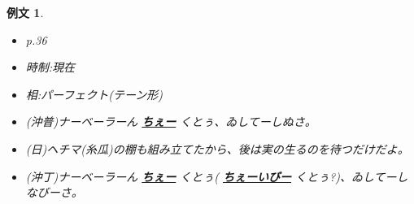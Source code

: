 \documentclass[a4j,12pt]{jarticle}
\theoremstyle{break}
\newtheorem{example}{例文}
\newcommand{\highlight}[1]{
  \textbf{\underline{#1}}
}
\begin{document}
\begin{example}
  \begin{itemize}
  \item p.36
  \item 時制:現在
  \item 相:パーフェクト(テーン形)
  \item (沖普)ナーベーラーん\highlight{ちぇー}くとぅ、ゐしてーしぬさ。
  \item (日)ヘチマ(糸瓜)の棚も組み立てたから、後は実の生るのを待つだけだよ。
  \item (沖丁)ナーベーラーん\highlight{ちぇー}くとぅ(\highlight{\ruby{組}{か}ちぇーいびー}くとぅ?)、ゐしてーしなびーさ。
  \end{itemize}
\end{example}
\end{document}
